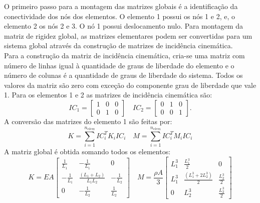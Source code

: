 \indent O primeiro passo para a montagem das matrizes globais é a identificação da conectividade dos nós dos elementos. O elemento 1 possui os nós 1 e 2, e, o elemento 2 os nós 2 e 3. O nó 1 possui deslocamento nulo. Para montagem da matriz de rigidez global, as matrizes elementares podem ser convertidas para um sistema global através da construção de matrizes de incidência cinemática. \\
\indent Para a construção da matriz de incidência cinemática, cria-se uma matriz com número de linhas igual à quantidade de graus de liberdade do elemento e o número de colunas é a quantidade de graus de liberdade do sistema. Todos os valores da matriz são zero com exceção do componente grau de liberdade que vale 1. Para os elementos 1 e 2 as matrizes de incidência cinemática são:
\begin{equation}
    IC_{1} = \begin{bmatrix} 1 & 0 & 0 \\ 0 & 1 & 0 \end{bmatrix} \quad IC_{2} = \begin{bmatrix} 0 & 1 & 0 \\ 0 & 0 & 1 \end{bmatrix}.
\end{equation}
\indent A conversão das matrizes do elemento 1 são feitas por:
\begin{equation}
    K = \sum_{i = 1}^{n_{elem}} IC_{i}^T K_i IC_{i}  \quad M = \sum_{i = 1}^{n_{elem}} IC_{i}^T M_i IC_{i}
\end{equation}
\indent A matriz global é obtida somando todos os elementos:
\begin{equation}
    K = EA \begin{bmatrix} \frac{1}{L_1} & -\frac{1}{L_1} & 0 \\ -\frac{1}{L_1} & \frac{(L_1 + L_2)}{L_1L_2} & -\frac{1}{L_2} \\ 0 & -\frac{1}{L_2} & \frac{1}{L_2} \end{bmatrix} \quad
    M = \frac{\rho A}{3} \begin{bmatrix}  L_1^3 & \frac{L_1^3}{2} & 0 \\ L_1^3 & \frac{(L_1^3 + 2L_2^3)}{2} & \frac{L_2^3}{2} \\ 0 &  L_2^3 & \frac{ L_2^3}{2}  \end{bmatrix}
\end{equation}

